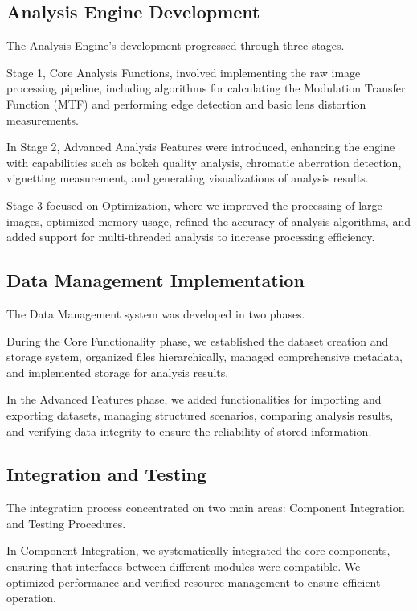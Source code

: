 \subsection{Analysis Engine Development}

The Analysis Engine's development progressed through three stages.

Stage 1, Core Analysis Functions, involved implementing the raw image processing pipeline, including algorithms for calculating the Modulation Transfer Function (MTF) and performing edge detection and basic lens distortion measurements.

In Stage 2, Advanced Analysis Features were introduced, enhancing the engine with capabilities such as bokeh quality analysis, chromatic aberration detection, vignetting measurement, and generating visualizations of analysis results.

Stage 3 focused on Optimization, where we improved the processing of large images, optimized memory usage, refined the accuracy of analysis algorithms, and added support for multi-threaded analysis to increase processing efficiency.

\subsection{Data Management Implementation}

The Data Management system was developed in two phases.

During the Core Functionality phase, we established the dataset creation and storage system, organized files hierarchically, managed comprehensive metadata, and implemented storage for analysis results.

In the Advanced Features phase, we added functionalities for importing and exporting datasets, managing structured scenarios, comparing analysis results, and verifying data integrity to ensure the reliability of stored information.

\subsection{Integration and Testing}

The integration process concentrated on two main areas: Component Integration and Testing Procedures.

In Component Integration, we systematically integrated the core components, ensuring that interfaces between different modules were compatible. We optimized performance and verified resource management to ensure efficient operation.

